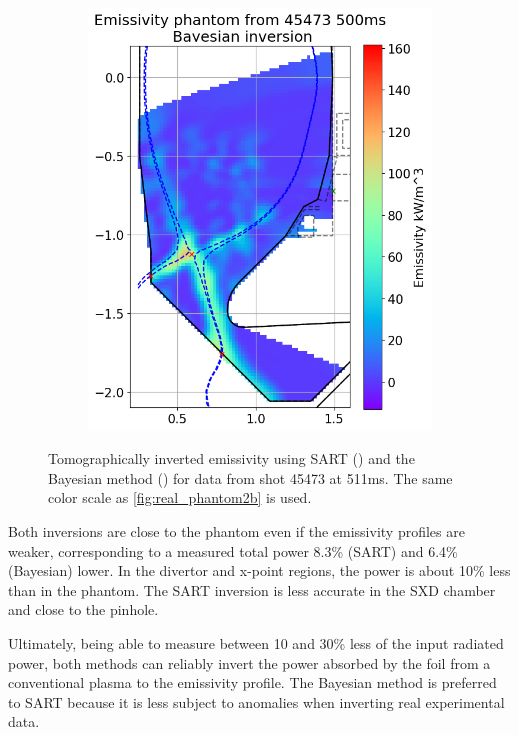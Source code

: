 \begin{figure}[!ht]
\begin{subfigure}{0.49\linewidth}
         \includegraphics[trim={10 5 0 43},clip,width=\textwidth]{Chapters/chapter2/figs/inversion_comparison_emissivity_pantom_test-Bayes.png}
         \caption{}
         \label{fig:self_phantom1b}
     \end{subfigure}
    \caption{Tomographically inverted emissivity using SART () and the Bayesian method () for data from shot 45473 at 511ms. The same color scale as \autoref{fig:real_phantom2b} is used.}
    \label{fig:self_phantom1}
\end{figure}

Both inversions are close to the phantom even if the emissivity profiles are weaker, corresponding to a measured total power 8.3\% (SART) and 6.4\% (Bayesian) lower. In the divertor and x-point regions, the power is about 10\% less than in the phantom. The SART inversion is less accurate in the SXD chamber and close to the pinhole.

Ultimately, being able to measure between 10 and 30\% less of the input radiated power, both methods can reliably invert the power absorbed by the foil from a conventional plasma to the emissivity profile. The Bayesian method is preferred to SART because it is less subject to anomalies when inverting real experimental data.

